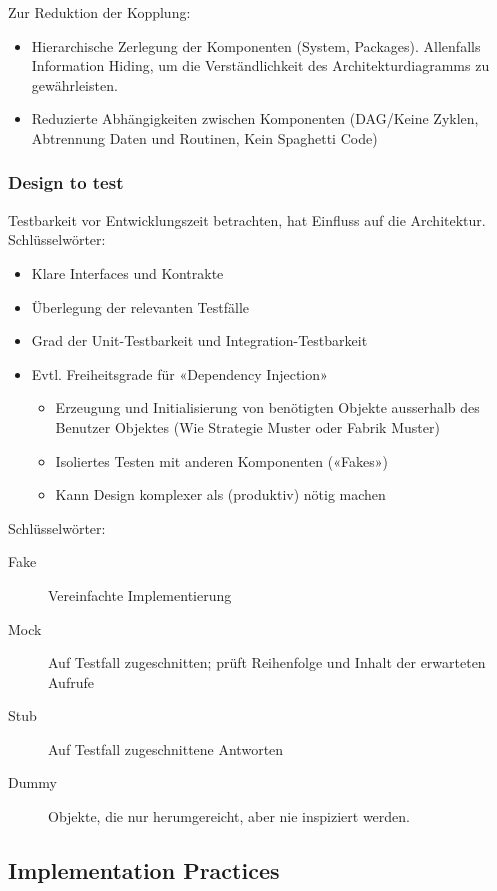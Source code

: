 Zur Reduktion der Kopplung:
\begin{itemize}
	\item Hierarchische Zerlegung der Komponenten (System, Packages). Allenfalls Information Hiding, um die Verständlichkeit des Architekturdiagramms zu gewährleisten.
	\item Reduzierte Abhängigkeiten zwischen Komponenten (DAG/Keine Zyklen, Abtrennung Daten und Routinen, Kein Spaghetti Code)
\end{itemize}


\subsubsection{Design to test}

Testbarkeit vor Entwicklungszeit betrachten, hat Einfluss auf die Architektur. Schlüsselwörter:
	\begin{itemize}
	\item Klare Interfaces und Kontrakte
	\item Überlegung der relevanten Testfälle
	\item Grad der Unit-Testbarkeit und Integration-Testbarkeit
	\item Evtl. Freiheitsgrade für «Dependency Injection»
		\begin{itemize}
			\item Erzeugung und Initialisierung von benötigten Objekte ausserhalb des Benutzer Objektes (Wie Strategie Muster oder Fabrik Muster)
			\item Isoliertes Testen mit anderen Komponenten («Fakes»)
			\item Kann Design komplexer als (produktiv) nötig machen
		\end{itemize}
\end{itemize}


Schlüsselwörter:
\begin{description}
	\item[Fake] Vereinfachte Implementierung
	\item[Mock] Auf Testfall zugeschnitten; prüft Reihenfolge und Inhalt der erwarteten Aufrufe
	\item[Stub] Auf Testfall zugeschnittene Antworten
	\item[Dummy] Objekte, die nur herumgereicht, aber nie inspiziert werden.
\end{description}

\subsection{Implementation Practices}

